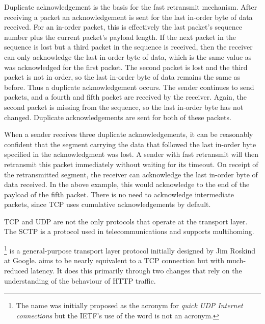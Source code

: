 Duplicate acknowledgement is the basis for the fast retransmit mechanism.
After receiving a packet an acknowledgement is sent for the last in-order byte of data received.
For an in-order packet, this is effectively the last packet's sequence number plus the current packet's payload length.
If the next packet in the sequence is lost but a third packet in the sequence is received, then the receiver can only acknowledge the last in-order byte of data, which is the same value as was acknowledged for the first packet.
The second packet is lost and the third packet is not in order, so the last in-order byte of data remains the same as before.
Thus a duplicate acknowledgement occurs.
The sender continues to send packets, and a fourth and fifth packet are received by the receiver.
Again, the second packet is missing from the sequence, so the last in-order byte has not changed.
Duplicate acknowledgements are sent for both of these packets.

When a sender receives three duplicate acknowledgements, it can be reasonably confident that the segment carrying the data that followed the last in-order byte specified in the acknowledgment was lost. 
A sender with fast retransmit will then retransmit this packet immediately without waiting for its timeout.
On receipt of the retransmitted segment, the receiver can acknowledge the last in-order byte of data received.
In the above example, this would acknowledge to the end of the payload of the fifth packet.
There is no need to acknowledge intermediate packets, since \acs{TCP} uses cumulative acknowledgements by default.








\acs{TCP} and \acs{UDP} are not the only protocols that operate at the transport layer.
The \acf{SCTP} is a protocol used in telecommunications and supports multihoming.

%
   \footnote{The name was initially proposed as the acronym for \emph{quick \acs{UDP} Internet connections} but the \acs{IETF}'s use of the word is not an acronym.}
is a general-purpose transport layer protocol initially designed by Jim Roskind at Google.
 aims to be nearly equivalent to a \acs{TCP} connection but with much-reduced latency.
It does this primarily through two changes that rely on the understanding of the behaviour of \acs{HTTP} traffic.

